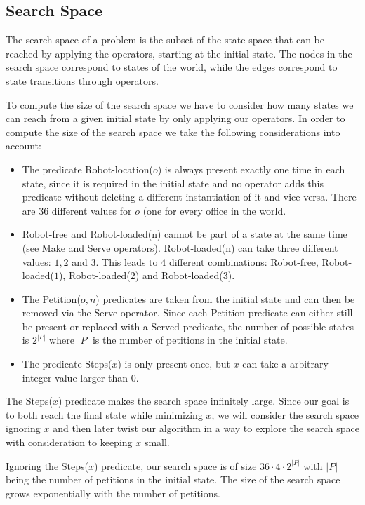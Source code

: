 \subsection{Search Space}
\label{sub:ss}

The search space of a problem is the subset of the state space that can be reached by applying the operators, starting at the initial state. The nodes in the search space correspond to states of the world, while the edges correspond to state transitions through operators.

To compute the size of the search space we have to consider how many states we can reach from a given initial state by only applying our operators. In order to compute the size of the search space we take the following considerations into account:

\begin{itemize}
	\item The predicate Robot-location($o$) is always present exactly one time in each state, since it is required in the initial state and no operator adds this predicate without deleting a different instantiation of it and vice versa. There are $36$ different values for $o$ (one for every office in the world. 
	\item Robot-free and Robot-loaded(n) cannot be part of a state at the same time (see Make and Serve operators). Robot-loaded(n) can take three different values: $1, 2$ and $3$. This leads to $4$ different combinations: Robot-free, Robot-loaded($1$), Robot-loaded($2$) and Robot-loaded($3$).
	\item The Petition($o,n$) predicates are taken from the initial state and can then be removed via the Serve operator. Since each Petition predicate can either still be present or replaced with a Served predicate, the number of possible states is $2^{|P|}$ where $|P|$ is the number of petitions in the initial state.
	\item The predicate Steps($x$) is only present once, but $x$ can take a arbitrary integer value larger than 0.
\end{itemize}

The Steps($x$) predicate makes the search space infinitely large. Since our goal is to both reach the final state while minimizing $x$, we will consider the search space ignoring $x$ and then later twist our algorithm in a way to explore the search space with consideration to keeping $x$ small.

Ignoring the Steps($x$) predicate, our search space is of size $36 \cdot 4 \cdot 2^{|P|}$ with $|P|$ being the number of petitions in the initial state. The size of the search space grows exponentially with the number of petitions.


